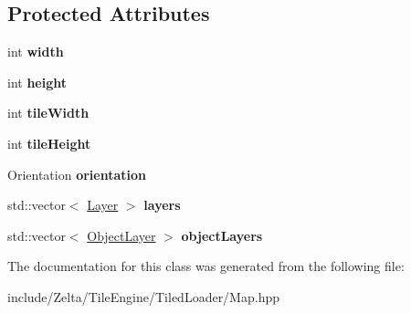 \subsection*{Protected Attributes}
\begin{DoxyCompactItemize}
\item 
\mbox{\label{classzt_1_1tiled_1_1_map_a7b065317a42d6a98ae275182729a59d5}} 
int {\bfseries width}
\item 
\mbox{\label{classzt_1_1tiled_1_1_map_a9c29ddcafc21491f8520e1b0f99e9c39}} 
int {\bfseries height}
\item 
\mbox{\label{classzt_1_1tiled_1_1_map_a693997ec67f196932c2b5423164cd39e}} 
int {\bfseries tile\+Width}
\item 
\mbox{\label{classzt_1_1tiled_1_1_map_a8777e8e66e02ecef64559d1d7e319ec5}} 
int {\bfseries tile\+Height}
\item 
\mbox{\label{classzt_1_1tiled_1_1_map_a35cbc297da3e7c99935ef3d05a12d1eb}} 
Orientation {\bfseries orientation}
\item 
\mbox{\label{classzt_1_1tiled_1_1_map_a655966027df4fb07327780d944f47373}} 
std\+::vector$<$ \hyperlink{classzt_1_1tiled_1_1_layer}{Layer} $>$ {\bfseries layers}
\item 
\mbox{\label{classzt_1_1tiled_1_1_map_aa511c68193fd8a6cb627ce65378f6e5e}} 
std\+::vector$<$ \hyperlink{classzt_1_1tiled_1_1_object_layer}{Object\+Layer} $>$ {\bfseries object\+Layers}
\end{DoxyCompactItemize}


The documentation for this class was generated from the following file\+:\begin{DoxyCompactItemize}
\item 
include/\+Zelta/\+Tile\+Engine/\+Tiled\+Loader/Map.\+hpp\end{DoxyCompactItemize}
